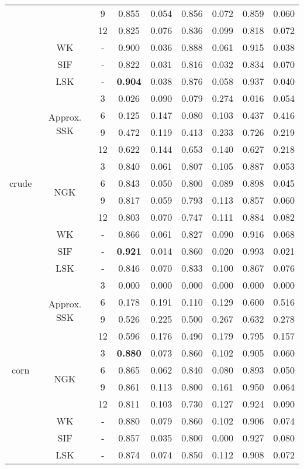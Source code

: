 \documentclass{article}
\begin{document}
\begin{table}[]
\begin{tabular}{|c|c|c|c|c|c|c|c|c|}
 & & 9 & 0.855 & 0.054 & 0.856 & 0.072 & 0.859 & 0.060  \\
& & 12 & 0.825 & 0.076 & 0.836 & 0.099 & 0.818 & 0.072  \\
\cline{2-9}
 & \multirow{1}{*}{WK}  & - & 0.900 & 0.036 & 0.888 & 0.061 & 0.915 & 0.038 \\ \cline{2-9}
 & \multirow{1}{*}{SIF} & - & 0.822 & 0.031 & 0.816 & 0.032 & 0.834 & 0.070 \\ \cline{2-9}
 & \multirow{1}{*}{LSK} & - & \textbf{0.904} & 0.038 & 0.876 & 0.058 & 0.937 & 0.040 \\ \hline
\multirow{11}{*}{crude}
& \multirow{4}{*}{Approx. SSK} & 3 & 0.026 & 0.090 & 0.079 & 0.274 & 0.016 & 0.054  \\
 & & 6 & 0.125 & 0.147 & 0.080 & 0.103 & 0.437 & 0.416  \\
 & & 9 & 0.472 & 0.119 & 0.413 & 0.233 & 0.726 & 0.219  \\
 & & 12 & 0.622 & 0.144 & 0.653 & 0.140 & 0.627 & 0.218  \\ \cline{2-9}
 & \multirow{4}{*}{NGK}
   & 3 & 0.840 & 0.061 & 0.807 & 0.105 & 0.887 & 0.053 \\
 & & 6 & 0.843 & 0.050 & 0.800 & 0.089 & 0.898 & 0.045 \\
 & & 9 & 0.817 & 0.059 & 0.793 & 0.113 & 0.857 & 0.060 \\
& & 12 & 0.803 & 0.070 & 0.747 & 0.111 & 0.884 & 0.082 \\
\cline{2-9}
 & \multirow{1}{*}{WK}  & - & 0.866 & 0.061 & 0.827 & 0.090 & 0.916 & 0.068 \\ \cline{2-9}
 & \multirow{1}{*}{SIF} & - & \textbf{0.921} & 0.014 & 0.860 & 0.020 & 0.993 & 0.021 \\ \cline{2-9}
 & \multirow{1}{*}{LSK} & - & 0.846 & 0.070 & 0.833 & 0.100 & 0.867 & 0.076 \\ \hline
 \multirow{11}{*}{corn}
& \multirow{4}{*}{Approx. SSK}
   & 3 & 0.000 & 0.000 & 0.000 & 0.000 & 0.000 & 0.000   \\
 & & 6 & 0.178 & 0.191 & 0.110 & 0.129 & 0.600 & 0.516  \\
 & & 9 & 0.526 & 0.225 & 0.500 & 0.267 & 0.632 & 0.278  \\
 & & 12 & 0.596 & 0.176 & 0.490 & 0.179 & 0.795 & 0.157  \\ \cline{2-9}
 & \multirow{4}{*}{NGK}
   & 3 &  \textbf{0.880} & 0.073 & 0.860 & 0.102 & 0.905 & 0.060  \\
 & & 6 &  0.865 & 0.062 & 0.840 & 0.080 & 0.893 & 0.050  \\
 & & 9 &  0.861 & 0.113 & 0.800 & 0.161 & 0.950 & 0.064  \\
& & 12 &  0.811 & 0.103 & 0.730 & 0.127 & 0.924 & 0.090  \\
\cline{2-9}
 & \multirow{1}{*}{WK}  & - & 0.880 & 0.079 & 0.860 & 0.102 & 0.906 & 0.074 \\ \cline{2-9}
 & \multirow{1}{*}{SIF} & - & 0.857 & 0.035 & 0.800 & 0.000 & 0.927 & 0.080 \\ \cline{2-9}
 & \multirow{1}{*}{LSK} & - & 0.874 & 0.074 & 0.850 & 0.112 & 0.908 & 0.072 \\ \hline
\end{tabular}
\end{table}
\end{document}
